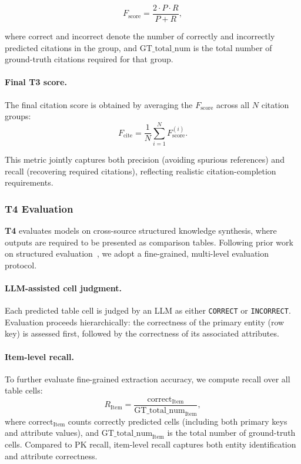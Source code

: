 \begin{equation}
F_{\text{score}} = \frac{2 \cdot P \cdot R}{P + R},
\end{equation}

where $\text{correct}$ and $\text{incorrect}$ denote the number of correctly and incorrectly predicted citations in the group, and $\text{GT\_total\_num}$ is the total number of ground-truth citations required for that group.

\paragraph{Final T3 score.}
The final citation score is obtained by averaging the $F_{\text{score}}$ across all $N$ citation groups:
\begin{equation}
F_{\text{cite}} = \frac{1}{N} \sum_{i=1}^{N} F_{\text{score}}^{(i)}.
\end{equation}

This metric jointly captures both precision (avoiding spurious references) and recall (recovering required citations), reflecting realistic citation-completion requirements.

\subsubsection{T4 Evaluation}

\noindent \textbf{T4} evaluates models on cross-source structured knowledge synthesis, where outputs are required to be presented as comparison tables.
Following prior work on structured evaluation~\cite{wong2025widesearch}, we adopt a fine-grained, multi-level evaluation protocol.

\paragraph{LLM-assisted cell judgment.}
Each predicted table cell is judged by an LLM as either \texttt{CORRECT} or \texttt{INCORRECT}.
Evaluation proceeds hierarchically: the correctness of the primary entity (row key) is assessed first, followed by the correctness of its associated attributes.

\paragraph{Item-level recall.}
To further evaluate fine-grained extraction accuracy, we compute recall over all table cells:
\begin{equation}
R_{\text{Item}} =
\frac{\text{correct}_{\text{Item}}}
{\text{GT\_total\_num}_{\text{Item}}},
\end{equation}
where $\text{correct}_{\text{Item}}$ counts correctly predicted cells (including both primary keys and attribute values), and $\text{GT\_total\_num}_{\text{Item}}$ is the total number of ground-truth cells.
Compared to PK recall, item-level recall captures both entity identification and attribute correctness.

